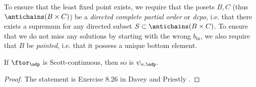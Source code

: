 


To ensure that the least fixed point exists, we require that the posets $B, C$ (thus $\antichains (B \times C)$) be a \emph{directed complete partial order} or \emph{dcpo}, i.e. that there exists a supremum for any directed subset $S \subset \antichains (B \times C)$. To ensure that we do not miss any solutions by starting with the wrong $b_{\text{in}}$, we also require that $B$ be \emph{pointed}, i.e. that it possess a unique bottom element.


\begin{lemma}
    If $\ftor_\adp$ is Scott-continuous, then so is $\psi_{a,\adp}$.
\end{lemma}

\begin{proof}
    The statement is Exercise 8.26 in Davey and Priestly \citeXXX.
\end{proof}


